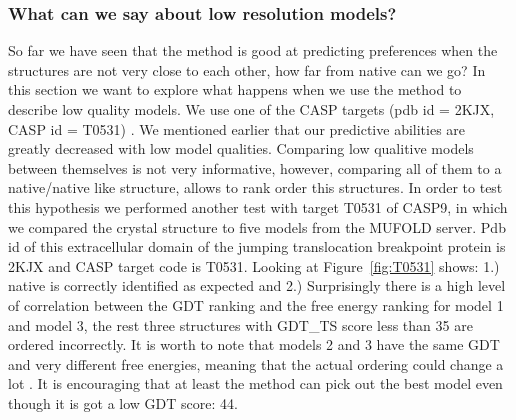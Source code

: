 \documentclass[12pt]{article}
\begin{document}
\subsubsection{What can we say about low resolution models?}

So far we have seen that the method is good at predicting preferences when the structures are not
very close to each other, how far from native can we go? In this section we want to explore what
happens when we use the method to describe low quality models. We use one of the CASP targets (pdb
id = 2KJX, CASP id = T0531) .
We mentioned earlier that our predictive abilities are greatly decreased with low model qualities. 
Comparing low qualitive models between themselves is not very informative,
    however, comparing all of them to a native/native like structure, allows to rank order this
structures. 
In order to test this hypothesis we performed another test with target T0531 of CASP9, in which we compared the crystal 
structure to five models from the MUFOLD server. Pdb id of this extracellular domain of the jumping translocation 
breakpoint protein is 2KJX and CASP target code is T0531.
Looking at Figure~\ref{fig:T0531} shows: 1.) native is correctly
identified as expected and 2.) Surprisingly there is a high level of correlation between the GDT
ranking and the free energy ranking for model 1 and model 3, the rest three structures with GDT\_TS score less than  35  are ordered
incorrectly. It is worth to note that models 2 and 3 have the same GDT and very different free
energies, meaning that the actual ordering could change a lot \cite{Perez2012}. It is encouraging that at least
the method can pick out the best model even though it is got a low GDT score: 44.  


\end{document}
